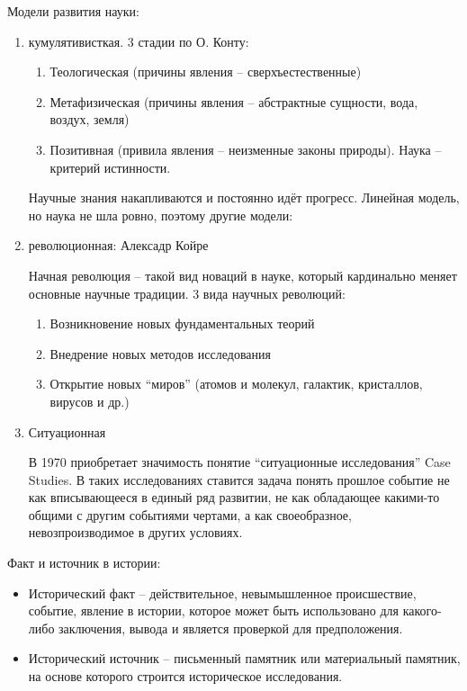 \documentclass{book}
\theoremstyle{definition}
\begin{document}
    Модели развития науки:
    \begin{enumerate}
        \item кумулятивисткая. 3 стадии по О. Конту:
            \begin{enumerate}
                \item Теологическая (причины явления -- сверхъестественные)
                \item Метафизическая (причины явления -- абстрактные сущности, вода, воздух, земля)
                \item Позитивная (привила явления -- неизменные законы природы). Наука -- критерий истинности.
            \end{enumerate}
            Научные знания накапливаются и постоянно идёт прогресс. Линейная модель, но наука не шла ровно, поэтому другие модели:
        \item революционная: Алексадр Койре

            Начная революция -- такой вид новаций в науке, который кардинально меняет основные научные традиции. 3 вида научных революций:
            \begin{enumerate}
                \item Возникновение новых фундаментальных теорий
                \item Внедрение новых методов исследования
                \item Открытие новых ``миров'' (атомов и молекул, галактик, кристаллов, вирусов и др.)
            \end{enumerate}
        \item Ситуационная

            В 1970 приобретает значимость понятие ``ситуационные исследования'' Case Studies. В таких исследованиях ставится задача понять прошлое событие не как вписывающееся в единый ряд развитии, не как обладающее какими-то общими с другим событиями чертами, а как своеобразное, невозпроизводимое в других условиях.
    \end{enumerate}

    Факт и источник в истории:
    \begin{itemize}
        \item Исторический факт -- действительное, невымышленное происшествие, событие, явление в истории, которое может быть использовано для какого-либо заключения, вывода и является проверкой для предположения.
        \item Исторический источник -- письменный памятник или материальный памятник, на основе которого строится историческое исследования.
    \end{itemize}
\end{document}
